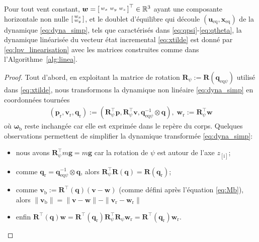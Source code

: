 \begin{theorem} \label{th:lin}
Pour tout vent constant, $\boldsymbol{w} =\left[ \begin{smallmatrix}w_x & w_y & w_z \end{smallmatrix} \right]^\top \in {\mathbb R}^3$ ayant une composante horizontale non nulle $\left[ \begin{smallmatrix}w_x \\ w_y \end{smallmatrix} \right]$, et le doublet d'équilibre qui découle $(\boldsymbol{u}_{\text{eq}}, \boldsymbol{x}_{\text{eq}})$ de la dynamique \eqref{eq:dyna_simp}, tels que caractérisés dans \eqref{eq:qpsi}-\eqref{eq:qtheta}, la dynamique linéarisée du vecteur état incremental \eqref{eq:xtilde} est donné par \eqref{eq:lpv_linearisation} avec les matrices construites comme dans l'Algorithme~\ref{alg:linea}.
\end{theorem}
%
\begin{proof}
Tout d'abord, en exploitant la matrice de rotation 
$\boldsymbol{R}_{\psi} :=    \boldsymbol{R}(\boldsymbol{q}_{\mathrm{eq}\psi})$ utilisé dans \eqref{eq:xtilde}, nous transformons la dynamique non linéaire \eqref{eq:dyna_simp} en coordonnées tournées
\begin{align}
\label{eq:rotated_coord}
(\boldsymbol{p}_{\text{r}} ,
\boldsymbol{v}_{\text{r}} ,
\boldsymbol{q}_{\text{r}}
)
:=
\left(\boldsymbol{R}_{\psi}^\top
\boldsymbol{p},
\boldsymbol{R}_{\psi}^\top \boldsymbol{v},
\boldsymbol{q}_{\mathrm{eq}\psi}^{-1} \otimes
\boldsymbol{q}
\right), 
\; \boldsymbol{w}_{\text{r}}:=\boldsymbol{R}_{\psi}^\top\boldsymbol{w}
\end{align}
où $\boldsymbol{\omega}_{\text{b}}$ reste inchangée car elle est exprimée dans le repère du corps. 
Quelques observations permettent de simplifier
la dynamique transformée \eqref{eq:dyna_simp}:
\begin{itemize}
    \item nous avons $\boldsymbol{R}_{\psi}^\top
    m\boldsymbol{g} = m\boldsymbol{g}$ car la rotation de $\psi$ est autour de l'axe $z_{[\text{i}]}$;
    \item comme $\boldsymbol{q}_{\text{r}} = \boldsymbol{q}_{\mathrm{eq}\psi}^{-1} \otimes \boldsymbol{q}$, alors $\boldsymbol{R}_{\psi}^\top \boldsymbol{R}(\boldsymbol{q}) = \boldsymbol{R}(\boldsymbol{q}_{\text{r}})$; 
    \item comme $\boldsymbol{v}_{\text{b}} := \boldsymbol{R}^\top(\boldsymbol{q}) (\boldsymbol{v}-\boldsymbol{w})$ (comme défini après l'équation \eqref{eq:Mb}), alors $\| \boldsymbol{v}_{\text{b}} \| = \| \boldsymbol{v} -  \boldsymbol{w}  \| - \| \boldsymbol{v}_{\text{r}} -  \boldsymbol{w}_{\text{r}}  \|$
    \item enfin $\boldsymbol{R}^\top(\boldsymbol{q}) \boldsymbol{w} = \boldsymbol{R}^\top\! (\boldsymbol{q}_{\text{r}}) \boldsymbol{R}_{\psi}^\top\! \boldsymbol{R}_{\psi} \boldsymbol{w}_{\text{r}}= \boldsymbol{R}^\top \!(\boldsymbol{q}_{\text{r}}) \boldsymbol{w}_{\text{r}}$.
\end{itemize} 


\end{proof}
